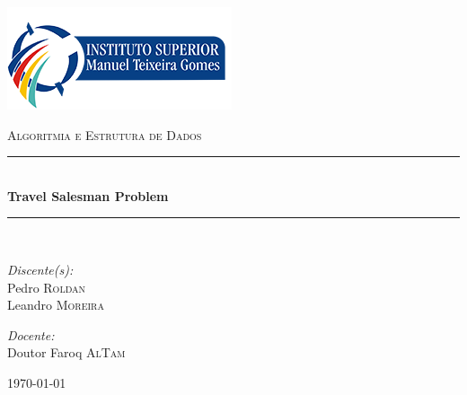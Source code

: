 \begin{titlepage}
	\begin{center}
	
		\includegraphics{./logo}
		
		
		
		\textsc{\Large Algoritmia e Estrutura de Dados}\\[1.5cm]
		
		\newcommand{\HRule}{\rule{\linewidth}{0.5mm}}
		\HRule \\[0.4cm]
		{ \huge \bfseries Travel Salesman Problem \\[0.4cm] }
		
		\HRule \\[1.5cm]
		
		\noindent
		
		\begin{minipage}[t]{0.4\textwidth}
			\begin{flushleft} \large
				\emph{Discente(s):}\\
				Pedro \textsc{Roldan}\\
				Leandro \textsc{Moreira}\\
			\end{flushleft}
		\end{minipage}%
		\begin{minipage}[t]{0.4\textwidth}
			\begin{flushright} \large
				\emph{Docente:} \\
				Doutor Faroq \textsc{AlTam}
			\end{flushright}
		\end{minipage}
		
		\vfill
		
		{\large \today}
	
	\end{center}
\end{titlepage}